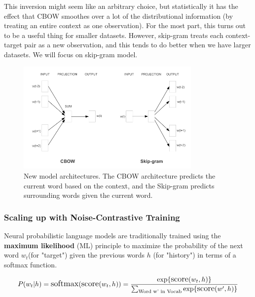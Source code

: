This inversion might seem like an arbitrary choice, but statistically it has the effect that CBOW smoothes over a lot of the distributional information (by treating an entire context as one observation). For the most part, this turns out to be a useful thing for smaller datasets. However, skip-gram treats each context-target pair as a new observation, and this tends to do better when we have larger datasets. We will focus on skip-gram model.

 \begin{figure}[H]%
     \center%
     \includegraphics[width=0.8\textwidth]{images/amira/cbow+skip.PNG}%
     \caption[CBOW and Skip-gram models architecture]{New model architectures. The CBOW architecture predicts the current word based on the context, and the Skip-gram predicts surrounding words given the current word.}\label{fig:cbow}%
 \end{figure}
 
\subsubsection{Scaling up with Noise-Contrastive Training}
     Neural probabilistic language models are traditionally trained using the \textbf{maximum likelihood} (ML) principle to maximize the probability of the next word ${w_t}$(for "target") given the previous words ${h}$  (for "history") in terms of a softmax function\cite{web001}\@.

 \begin{equation}
       \large
          P(w_t | h) = \text{softmax} (\text{score} (w_t, h)) \\
                     = \frac{\exp \{ \text{score} (w_t, h) \} }
                     {\sum_\text{Word w' in Vocab} \exp \{ \text{score} (w', h) \} }
 \end{equation}
 
